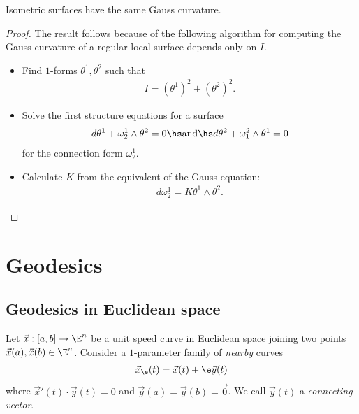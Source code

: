 \documentclass{article}
\begin{document}
\begin{theorem}
    Isometric surfaces have the same Gauss curvature.
\end{theorem}
\begin{proof}
    The result follows because of the following algorithm for computing the Gauss curvature 
    of a regular local surface depends only on $I$.
    \begin{itemize}
        \item Find $1$-forms $\theta^1,\theta^2$ such that \begin{align*}
            I = (\theta^1)^2 + (\theta^2)^2.
        \end{align*}
        \item Solve the first structure equations for a surface \begin{align*}
            d\theta^1 + \omega_2^1 \wedge \theta^2 = 0\hs\text{and}\hs
            d\theta^2 + \omega_1^2 \wedge \theta^1 = 0
        \end{align*}
        for the connection form $\omega_2^1$.
        \item Calculate $K$ from the equivalent of the Gauss equation: \begin{align*}
            d\omega_2^1 = K\theta^1\wedge\theta^2.
        \end{align*}
    \end{itemize}
\end{proof}

\section{Geodesics}

\subsection{Geodesics in Euclidean space}

\begin{definition}
    Let $\vec x:[a,b]\to\E^n$ be a unit speed curve in Euclidean space joining two points 
    $\vec x(a),\vec x(b)\in\E^n$. Consider a $1$-parameter family of \emph{nearby} curves 
    \begin{align*}
        \vec x_\e (t) = \vec x(t) + \e\vec y(t)
    \end{align*}
    where $\vec x'(t) \cdot \vec y(t)  = 0$ and $\vec y(a)=\vec y(b)=\vec 0$.
    We call $\vec y(t)$ a \emph{connecting vector}.
\end{definition}
\end{document}

